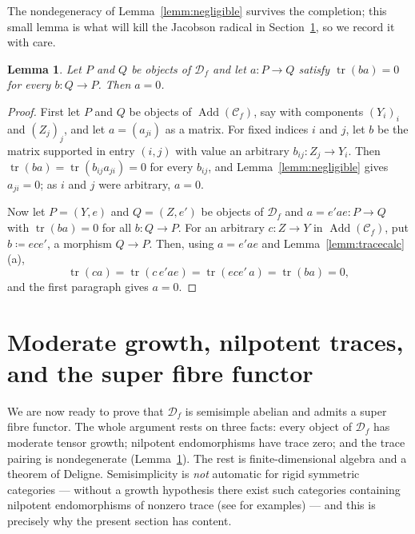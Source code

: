 \documentclass[11pt]{article}
\newtheorem{lemm}[theo]{Lemma}
\newcommand{\conncat}{\mathcal{C}_{f}}            %
\newcommand{\cauchy}{\mathcal{D}_{f}}             %
\newcommand{\Add}{\operatorname{Add}}
\newcommand{\tr}{\operatorname{tr}}
\begin{document}
The nondegeneracy of Lemma~\ref{lemm:negligible} survives the
completion; this small lemma is what will kill the Jacobson radical
in Section~\ref{sec:semisimple}, so we record it with care.

\begin{lemm}\label{lemm:nondegD}
Let $P$ and $Q$ be objects of $\cauchy$ and let $a\colon P\to Q$
satisfy $\tr(ba)=0$ for every $b\colon Q\to P$. Then $a=0$.
\end{lemm}

\begin{proof}
First let $P$ and $Q$ be objects of $\Add(\conncat)$, say with
components $(Y_{i})_{i}$ and $(Z_{j})_{j}$, and let
$a=(a_{ji})$ as a matrix. For fixed indices $i$ and $j$, let $b$
be the matrix supported in entry $(i,j)$ with value an arbitrary
$b_{ij}\colon Z_{j}\to Y_{i}$. Then
$\tr(ba)=\tr(b_{ij}a_{ji})=0$ for every $b_{ij}$, and
Lemma~\ref{lemm:negligible} gives $a_{ji}=0$; as $i$ and $j$ were
arbitrary, $a=0$.

Now let $P=(Y,e)$ and $Q=(Z,e')$ be objects of $\cauchy$ and
$a=e'ae\colon P\to Q$ with $\tr(ba)=0$ for all $b\colon Q\to P$.
For an arbitrary $c\colon Z\to Y$ in $\Add(\conncat)$, put
$b\coloneqq ece'$, a morphism $Q\to P$. Then, using $a=e'ae$ and
Lemma~\ref{lemm:tracecalc}(a),
\[
\tr(ca)=\tr(c\,e'ae)=\tr(ece'\,a)=\tr(ba)=0 ,
\]
and the first paragraph gives $a=0$.
\end{proof}

\section{Moderate growth, nilpotent traces, and the super fibre
functor}\label{sec:semisimple}

We are now ready to prove that $\cauchy$ is semisimple abelian
and admits a super fibre functor. The whole
argument rests on three facts: every object of $\cauchy$ has
moderate tensor growth; nilpotent endomorphisms have trace zero;
and the trace pairing is nondegenerate
(Lemma~\ref{lemm:nondegD}). The rest is finite-dimensional algebra
and a theorem of Deligne. Semisimplicity is \emph{not} automatic
for rigid symmetric categories --- without a growth hypothesis
there exist such categories containing nilpotent endomorphisms of
nonzero trace (see \cite[\S3.4]{EP26} for examples) --- and this
is precisely why the present section has content.
\end{document}
